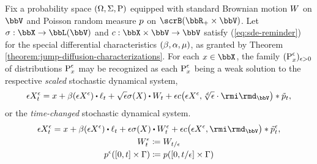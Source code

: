 \begin{proposition}
  \label{proposition:sde-asymptotics}
  Fix a probability space $(\Omega, \Sigma, {\operatorname{P}})$ equipped with standard Brownian motion $W$ on $\vecSpace$ and Poisson random measure $p$ on $\scrB(\bbR_+\times\vecSpace)$.
  Let $\affDiffSqrt: \stateSpace \rightarrow \bbL(\vecSpace)$ and $\thinner: \stateSpace \times \vecSpace \rightarrow \vecSpace$ satisfy (\ref{eq:sde-reminder}) for the special differential characteristics $(\beta, \alpha, \mu)$, as granted by Theorem \ref{theorem:jump-diffusion-characterizations}.
  For each $\stateVar \in \stateSpace$, the family $({\operatorname{P}}^\epsilon_x)_{\epsilon>0}$ of distributions ${\operatorname{P}}^\epsilon_x$ may be recognized as each ${\operatorname{P}}^\epsilon_x$ being a weak solution to the respective \emph{scaled} stochastic dynamical system,
  \begin{equation*}
    \Xe_t = \stateVar + \affDrift(\Xe) \shortInt \leb_t + \sqrt\epsilon \affDiffSqrt(\X) \shortInt \W_t + \epsilon\thinner\big(\Xe, \sqrt[d]{\epsilon} \cdot \id_\vecSpace\big) \ast \compensate{\poisRM}_t,
  \end{equation*}
  or the \emph{time-changed} stochastic dynamical system.
  \begin{gather*}
    \Xe_t = \stateVar + \affDrift(\Xe) \shortInt \leb_t + \epsilon \affDiffSqrt(\X) \shortInt \W^\epsilon_t + \epsilon\thinner\big(\Xe, \id_\vecSpace\big) \ast \compensate{\poisRM^\epsilon}_t, \\
    \W^\epsilon_t \defeq \W_{t/\epsilon} \\
    \poisRM^\epsilon([0,t]\times \Gamma) \defeq \poisRM([0,t/\epsilon] \times \Gamma)
  \end{gather*}
\end{proposition}
